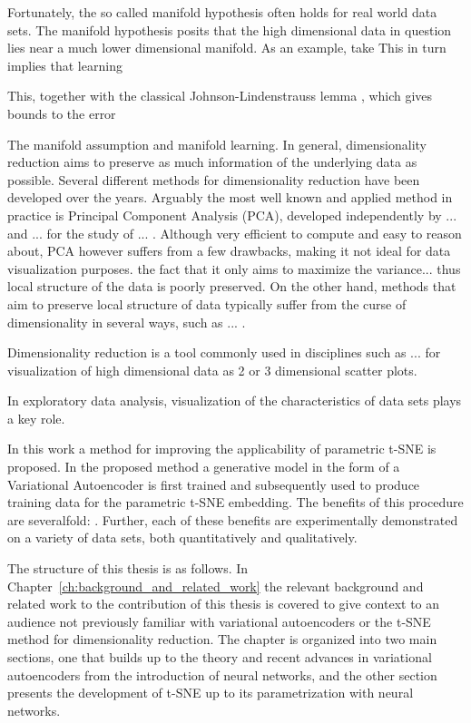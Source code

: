 Fortunately, the so called manifold hypothesis \cite{manifold_hypothesis} often holds for real world data sets. The manifold hypothesis posits that the high dimensional data in question lies near a much lower dimensional manifold. As an example, take This in turn implies that learning  

This, together with the classical Johnson-Lindenstrauss lemma \cite{johnson_lindenstrauss}, which gives bounds to the error 

The manifold assumption and manifold learning. In general, dimensionality reduction aims to preserve as much information of the underlying data as possible. Several different methods for dimensionality reduction have been developed over the years. Arguably the most well known and applied method in practice is Principal Component Analysis (PCA), developed independently by ... \cite{pca_1} and ... \cite{pca_2} for the study of ... . Although very efficient to compute and easy to reason about, PCA however suffers from a few drawbacks, making it not ideal for data visualization purposes. the fact that it only aims to maximize the variance... thus local structure of the data is poorly preserved. On the other hand, methods that aim to preserve local structure of data typically suffer from the curse of dimensionality in several ways, such as ... .

Dimensionality reduction is a tool commonly used in disciplines such as ... for visualization of high dimensional data as 2 or 3 dimensional scatter plots. 

In exploratory data analysis, visualization of the characteristics of data sets plays a key role.

In this work a method for improving the applicability of parametric t-SNE is proposed. In the proposed method a generative model in the form of a Variational Autoencoder is first trained and subsequently used to produce training data for the parametric t-SNE embedding. The benefits of this procedure are severalfold: . Further, each of these benefits are experimentally demonstrated on a variety of data sets, both quantitatively and qualitatively.

The structure of this thesis is as follows. In Chapter~\ref{ch:background_and_related_work} the relevant background and related work to the contribution of this thesis is covered to give context to an audience not previously familiar with variational autoencoders or the t-SNE method for dimensionality reduction. The chapter is organized into two main sections, one that builds up to the theory and recent advances in variational autoencoders from the introduction of neural networks, and the other section presents the development of t-SNE up to its parametrization with neural networks.


